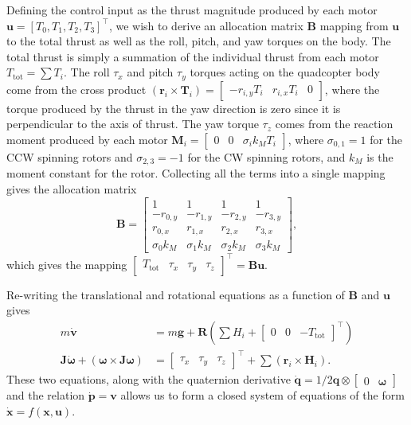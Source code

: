 \documentclass[11pt]{article}
\newcommand{\mb}[1]{\mathbf{#1}}
\begin{document}
Defining the control input as the thrust magnitude produced by each motor $\mb{u} = [T_0, T_1, T_2, T_3]^\top$, we wish to derive an allocation matrix $\mb{B}$ mapping from $\mb{u}$ to the total thrust as well as the roll, pitch, and yaw torques on the body.
The total thrust is simply a summation of the individual thrust from each motor $T_{\mathrm{tot}} = \sum{T_i}$.
The roll $\tau_x$ and pitch $\tau_y$ torques acting on the quadcopter body come from the cross product $(\mb{r}_i \times \mb{T}_i) = \begin{bmatrix} -r_{i,y} T_i & r_{i,x} T_i & 0 \end{bmatrix}$, where the torque produced by the thrust in the yaw direction is zero since it is perpendicular to the axis of thrust.
The yaw torque $\tau_z$ comes from the reaction moment produced by each motor $\mb{M}_i = \begin{bmatrix} 0 & 0 & \sigma_i k_M T_i \end{bmatrix}$, where $\sigma_{0,1} = 1$ for the CCW spinning rotors and $\sigma_{2,3} = -1$ for the CW spinning rotors, and $k_M$ is the moment constant for the rotor.
Collecting all the terms into a single mapping gives the allocation matrix
\begin{equation}
\mb{B} = 
\begin{bmatrix}
1 & 1 & 1 & 1\\
-r_{0,y}&  -r_{1,y}&  -r_{2,y} & -r_{3,y}\\
r_{0,x}&  r_{1,x}&  r_{2,x} & r_{3,x}\\
\sigma_0 k_M & \sigma_1 k_M & \sigma_2 k_M & \sigma_3 k_M
\end{bmatrix},
\end{equation}
which gives the mapping $\begin{bmatrix}T_{\mathrm{tot}} & \tau_x & \tau_y & \tau_z \end{bmatrix}^\top = \mb{B}\mb{u}$.

Re-writing the translational and rotational equations as a function of $\mb{B}$ and $\mb{u}$ gives
\begin{equation}
\begin{aligned}
m\dot{\mb{v}} &= m\mb{g} + \mb{R}(\sum{H}_i + \begin{bmatrix} 0 & 0 & -T_{\mathrm{tot}}\end{bmatrix}^\top) \\
\mb{J}\dot{\boldsymbol{\omega}} + (\boldsymbol{\omega} \times \mb{J}\boldsymbol{\omega}) &= \begin{bmatrix}\tau_x & \tau_y & \tau_z \end{bmatrix}^\top + \sum{(\mb{r}_i \times \mb{H}_i)}.
\end{aligned}
\end{equation}
These two equations, along with the quaternion derivative $\dot{\mb{q}} = 1/2 \mb{q} \otimes \begin{bmatrix}0 & \boldsymbol{\omega} \end{bmatrix}$ and the relation $\dot{\mb{p}} = \mb{v}$ allows us to form a closed system of equations of the form $\dot{\mb{x}} = f(\mb{x},\mb{u})$.
\end{document}
